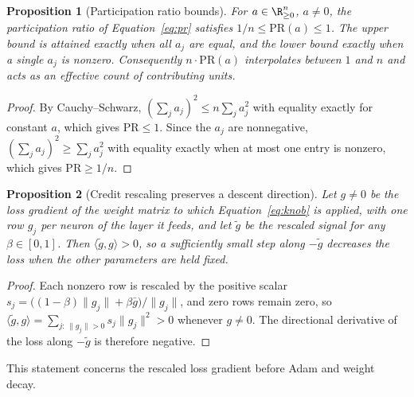 \documentclass{article} %
\newtheorem{proposition}{Proposition}
\begin{document}
\begin{proposition}[Participation ratio bounds]
\label{prop:pr}
For $a \in \R^n_{\geq 0}$, $a \neq 0$, the participation ratio of Equation~\ref{eq:pr} satisfies $1/n \leq \mathrm{PR}(a) \leq 1$. The upper bound is attained exactly when all $a_j$ are equal, and the lower bound exactly when a single $a_j$ is nonzero. Consequently $n \cdot \mathrm{PR}(a)$ interpolates between $1$ and $n$ and acts as an effective count of contributing units.
\end{proposition}
\begin{proof}
By Cauchy--Schwarz, $(\sum_j a_j)^2 \leq n \sum_j a_j^2$ with equality exactly for constant $a$, which gives $\mathrm{PR} \leq 1$. Since the $a_j$ are nonnegative, $(\sum_j a_j)^2 \geq \sum_j a_j^2$ with equality exactly when at most one entry is nonzero, which gives $\mathrm{PR} \geq 1/n$.
\end{proof}

\begin{proposition}[Credit rescaling preserves a descent direction]
\label{prop:descent}
Let $g \neq 0$ be the loss gradient of the weight matrix to which Equation~\ref{eq:knob} is applied, with one row $g_j$ per neuron of the layer it feeds, and let $\tilde{g}$ be the rescaled signal for any $\beta \in [0,1]$. Then $\langle \tilde{g}, g \rangle > 0$, so a sufficiently small step along $-\tilde{g}$ decreases the loss when the other parameters are held fixed.
\end{proposition}
\begin{proof}
Each nonzero row is rescaled by the positive scalar $s_j = \big((1-\beta)\|g_j\| + \beta \bar{g}\big) / \|g_j\|$, and zero rows remain zero, so
$\langle \tilde{g}, g \rangle = \sum_{j:\, \|g_j\| > 0} s_j \|g_j\|^2 > 0$ whenever $g \neq 0$. The directional derivative of the loss along $-\tilde{g}$ is therefore negative.
\end{proof}
This statement concerns the rescaled loss gradient before Adam and weight decay.
\end{document}
